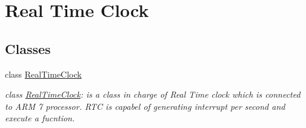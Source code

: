 \hypertarget{group__group9}{
\section{Real Time Clock}
\label{db/d5e/group__group9}
}
\subsection*{Classes}
\begin{DoxyCompactItemize}
\item 
class \hyperlink{class_real_time_clock}{RealTimeClock}
\begin{DoxyCompactList}\small\item\em class \hyperlink{class_real_time_clock}{RealTimeClock}: is a class in charge of Real Time clock which is connected to ARM 7 processor. RTC is capabel of generating interrupt per second and execute a fucntion. \end{DoxyCompactList}\end{DoxyCompactItemize}
